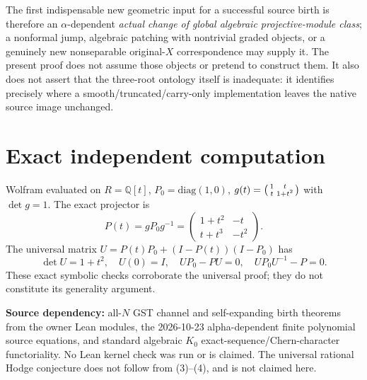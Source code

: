 \documentclass[11pt]{article}
\begin{document}
The first indispensable new geometric input for a successful source birth is therefore an \(\alpha\)-dependent \emph{actual change of global algebraic projective-module class}; a nonformal jump, algebraic patching with nontrivial graded objects, or a genuinely new nonseparable original-\(X\) correspondence may supply it. The present proof does not assume those objects or pretend to construct them. It also does not assert that the three-root ontology itself is inadequate: it identifies precisely where a smooth/truncated/carry-only implementation leaves the native source image unchanged.

\section{Exact independent computation}
Wolfram evaluated on \(R=\mathbb Q[t]\), \(P_0=\mathrm{diag}(1,0)\), \(g(t)=\begin{psmallmatrix}1&t\\ t&1+t^2\end{psmallmatrix}\) with \(\det g=1\). The exact projector is
\[
P(t)=gP_0g^{-1}=
\begin{pmatrix}1+t^2&-t\\t+t^3&-t^2\end{pmatrix}.
\]
The universal matrix \(U=P(t)P_0+(I-P(t))(I-P_0)\) has
\[
\det U=1+t^2,\quad U(0)=I,\quad UP_0-PU=0,\quad
UP_0U^{-1}-P=0.
\]
These exact symbolic checks corroborate the universal proof; they do not constitute its generality argument.

\noindent\textbf{Source dependency:} all-\(N\) GST channel and self-expanding birth theorems from the owner Lean modules, the 2026-10-23 alpha-dependent finite polynomial source equations, and standard algebraic \(K_0\) exact-sequence/Chern-character functoriality. No Lean kernel check was run or is claimed. The universal rational Hodge conjecture does not follow from (3)--(4), and is not claimed here.
\end{document}
